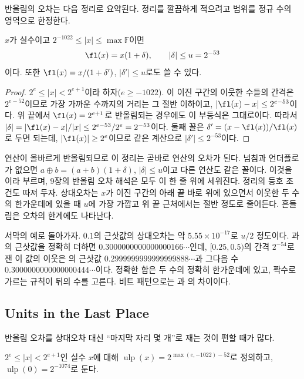 반올림의 오차는 다음 정리로 요약된다. 정리를 깔끔하게 적으려고 범위를 정규 수의 영역으로 한정한다.

\begin{theorem}
\label{thm:standard-model}
$x$가 실수이고 $2^{-1022}\le|x|\le\max\mathbb F$이면
\[
\fl(x)=x(1+\delta),\qquad|\delta|\le u=2^{-53}
\]
이다. 또한 $\fl(x)=x/(1+\delta')$, $|\delta'|\le u$로도 쓸 수 있다.
\end{theorem}

\begin{proof}
$2^e\le|x|<2^{e+1}$이라 하자($e\ge-1022$). 이 이진 구간의 이웃한 수들의 간격은 $2^{e-52}$이므로 가장 가까운 수까지의 거리는 그 절반 이하이고, $|\fl(x)-x|\le2^{e-53}$이다. 위 끝에서 $\fl(x)=2^{e+1}$로 반올림되는 경우에도 이 부등식은 그대로이다. 따라서 $|\delta|=|\fl(x)-x|/|x|\le2^{e-53}/2^e=2^{-53}$이다. 둘째 꼴은 $\delta'=(x-\fl(x))/\fl(x)$로 두면 되는데, $|\fl(x)|\ge2^e$이므로 같은 계산으로 $|\delta'|\le2^{-53}$이다.
\end{proof}

연산이 올바르게 반올림되므로 이 정리는 곧바로 연산의 오차가 된다. 넘침과 언더플로가 없으면 $a\oplus b=(a+b)(1+\delta)$, $|\delta|\le u$이고 다른 연산도 같은 꼴이다. 이것을 이라 부르며, 9장의 반올림 오차 해석은 모두 이 한 줄 위에 세워진다. 정리의 등호 조건도 따져 두자. 상대오차는 $x$가 이진 구간의 아래 끝 바로 위에 있으면서 이웃한 두 수의 한가운데에 있을 때 $u$에 가장 가깝고 위 끝 근처에서는 절반 정도로 줄어든다. 흔들림은 오차의 한계에도 나타난다.

서막의 예로 돌아가자. $0.1$의 근삿값의 상대오차는 약 $5.55\times10^{-17}$로 $u/2$ 정도이다. 과 의 근삿값을 정확히 더하면 $0.3000000000000000166\cdots$인데, $[0.25,0.5)$의 간격 $2^{-54}$로 잰 이 값의 이웃은 의 근삿값 $0.2999999999999999888\cdots$과 그다음 수 $0.3000000000000000444\cdots$이다. 정확한 합은 두 수의 정확히 한가운데에 있고, 짝수로 가르는 규칙이 뒤의 수를 고른다. 비트 패턴으로는 과 의 차이이다.

\subsection{Units in the Last Place}

반올림 오차를 상대오차 대신 ``마지막 자리 몇 개''로 재는 것이 편할 때가 많다.

\begin{definition}[ULP]
\label{def:ulp}
$2^e\le|x|<2^{e+1}$인 실수 $x$에 대해 $\operatorname{ulp}(x)=2^{\max(e,-1022)-52}$로 정의하고, $\operatorname{ulp}(0)=2^{-1074}$로 둔다.
\end{definition}

